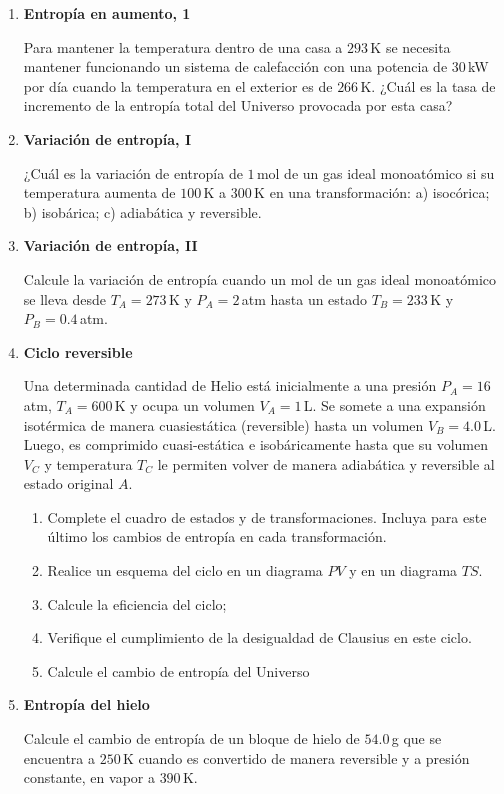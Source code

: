 \documentclass[a4paper,12pt]{article}
\begin{document}
\begin{enumerate}
	\item {\bf{Entropía en aumento, 1}}

		Para mantener la temperatura dentro de una casa a $293$\,K se necesita
		mantener funcionando un sistema de calefacción con una potencia de
		$30$\,kW por día cuando la temperatura en el exterior es de $266$\,K.
		¿Cuál es la tasa de incremento de la entropía total del Universo
		provocada por esta casa?

	\item {\bf{Variación de entropía, I}}

		¿Cuál es la variación de entropía de $1$\,mol de un gas ideal
		monoatómico si su temperatura aumenta de $100$\,K a $300$\,K en una
		transformación: a) isocórica; b) isobárica; c) adiabática y reversible.

	\item {\bf{Variación de entropía, II}}
		
		Calcule la variación de entropía cuando un mol de un gas ideal
		monoatómico se lleva desde $T_A=273$\,K y $P_A=2$\,atm hasta un estado
		$T_B=233$\,K y $P_B=0.4$\,atm.

	\item {\bf{Ciclo reversible}}

		Una determinada cantidad de Helio está inicialmente a una presión
		$P_A=16$\,atm, $T_A=600$\,K y ocupa un volumen $V_A=1$\,L. Se somete a
		una expansión isotérmica de manera cuasiestática (reversible) hasta un
		volumen $V_B=4.0$\,L. Luego, es comprimido cuasi-estática e
		isobáricamente hasta que su volumen $V_C$ y temperatura $T_C$ le
		permiten volver de manera adiabática y reversible al estado original
		$A$. 
		\begin{enumerate}
			\item Complete el cuadro de estados y de transformaciones. Incluya
				para este último los cambios de entropía en cada
				transformación. 
			\item Realice un esquema del ciclo en un diagrama $PV$ y en un
				diagrama $TS$. 
			\item Calcule la eficiencia del ciclo; 
			\item Verifique el cumplimiento de la desigualdad de Clausius en
				este ciclo.
			\item Calcule el cambio de entropía del Universo
		\end{enumerate}

	\item {\bf{Entropía del hielo}}

		Calcule el cambio de entropía de un bloque de hielo de $54.0$\,g que se
		encuentra a $250$\,K cuando es convertido de manera reversible y a
		presión constante, en vapor a $390$\,K.


\end{enumerate}
\end{document}
